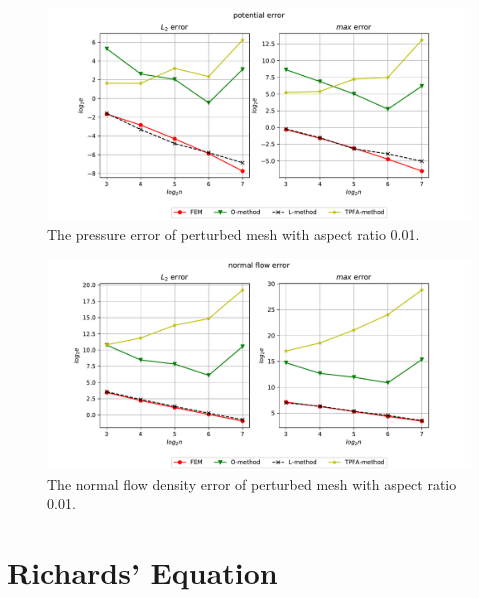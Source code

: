 \documentclass[../Main/main.tex]{subfiles}
\begin{document}
		\begin{figure}[H]
			\advance\leftskip-1cm
			\includegraphics[width=1.2\textwidth]{pressure_perturbed_1d100.pdf}
			\caption{The pressure error of perturbed mesh with aspect ratio 0.01.}
			\label{fig:mesh_perturbed_potential_1d100}
		\end{figure}
		\begin{figure}[H]
			\advance\leftskip-1cm
			\includegraphics[width=1.2\textwidth]{flow_aspect100.pdf}
			\caption{The normal flow density error of perturbed mesh with aspect ratio 0.01.}
			\label{fig:mesh_perturbed_flow_1d100}
		\end{figure}
	\section{Richards' Equation}
	\label{sec:numerics_richards}
\end{document}
